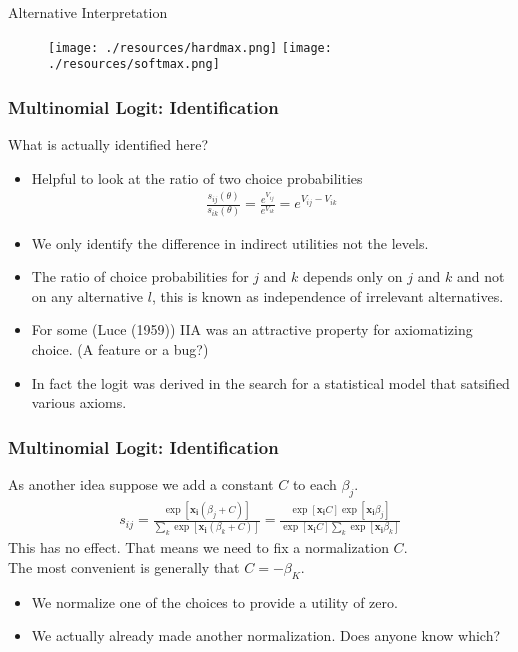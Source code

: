 \documentclass[aspectratio=169,11pt]{beamer}
\begin{document}
\begin{frame}{Alternative Interpretation}
\begin{figure}[htbp]
\begin{center}
\texttt{[image: ./resources/hardmax.png]}
\texttt{[image: ./resources/softmax.png]}
\end{center}
\end{figure}
\end{frame}

\begin{frame}
\frametitle{Multinomial Logit: Identification}
What is actually identified here?
\begin{itemize}
\item Helpful to look at the ratio of two choice probabilities
\begin{align*}
\frac{s_{ij}(\theta)}{s_{ik}(\theta)}  = \frac{e^{V_{ij}}}{e^{V_{ik}}} = e^{V_{ij} - V_{ik}}
\end{align*}
\item We only identify the \alert{difference in indirect utilities} not the levels.
\item The ratio of choice probabilities for $j$ and $k$ depends only on $j$ and $k$ and not on any alternative $l$, this is known as \alert{independence of irrelevant alternatives}.
\item For some (Luce (1959)) IIA was an attractive property for axiomatizing choice. (A feature or a bug?)
\item In fact the logit was derived in the search for a statistical model that satsified various axioms.
\end{itemize}
\end{frame}

\begin{frame}
\frametitle{Multinomial Logit: Identification}
As another idea suppose we add a constant $C$ to each $\beta_j$.
\begin{eqnarray*}
s_{ij} = \frac{\exp[\mathbf{x_i} (\beta_j+C) ]}{\sum_k \exp[\mathbf{x_i} (\beta_k+C) ]} =  \frac{\exp[\mathbf{x_i} C] \exp[\mathbf{x_i} \beta_j ]}{\exp[\mathbf{x_i} C] \sum_k \exp[\mathbf{x_i} \beta_k ]}
\end{eqnarray*}
This has no effect.  That means we need to fix a normalization $C$.\\
 The most convenient is generally that $C = - \beta_K$.
\begin{itemize}
\item We normalize one of the choices to provide a utility of zero.
\item We actually already made another normalization. Does anyone know which?
\end{itemize}
\end{frame}
\end{document}
